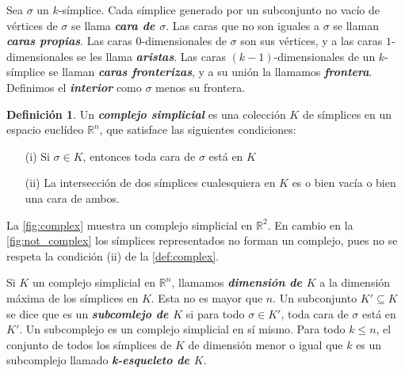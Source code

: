 \documentclass[10pt]{report}
\newcommand{\R}{\mathbb{R}}
\newcommand{\enfatiza}[1]{\textbf{\textit{#1}}}
\theoremstyle{definition}
\newtheorem{defin}{Definición}[section]
\begin{document}
Sea $\sigma$ un $k$-símplice. Cada símplice generado por un subconjunto no vacío de vértices de $\sigma$ se llama \enfatiza{cara de $\sigma$}. Las caras que no son iguales a $\sigma$ se llaman \enfatiza{caras propias}. Las caras $0$-dimensionales de $\sigma$ son sus vértices, y a las caras $1$-dimensionales se les llama \enfatiza{aristas}. Las caras $(k-1)$-dimensionales de un $k$-símplice se llaman \enfatiza{caras fronterizas}, y a su unión la llamamos \enfatiza{frontera}. Definimos el \enfatiza{interior} como $\sigma$ menos su frontera. 


\begin{defin}%
Un \enfatiza{complejo simplicial} es una colección $K$ de símplices en un espacio euclídeo $\R ^n$, que satisface las siguientes condiciones:
\begin{itemize}
\item[(i)] Si $\sigma \in K $, entonces toda cara de $\sigma$ está en $K$
\item[(ii)] La intersección de dos símplices cualesquiera en $K$ es o bien vacía o bien una cara de ambos.
\end{itemize}
\label{def:complex}
\end{defin}

La \autoref{fig:complex} muestra un complejo simplicial en $\R^2$. En cambio en la \autoref{fig:not_complex} los símplices representados no forman un complejo, pues no se respeta la condición (ii) de la \autoref{def:complex}.

Si $K$ un complejo simplicial en $\R ^n$, llamamos \enfatiza{dimensión de $K$} a la dimensión máxima de los símplices en $K$. Esta no es mayor que $n$.
Un subconjunto $K'\subseteq K$ se dice que es un \enfatiza{subcomlejo de $K$} si para todo $\sigma \in K'$, toda cara de $\sigma$ está en $K'$. Un subcomplejo es un complejo simplicial en sí mismo.
Para todo $k\leq n$, el conjunto de todos los símplices de $K$ de dimensión menor o igual que $k$ es un subcomplejo llamado \enfatiza{k-esqueleto de $K$}.
\end{document}
